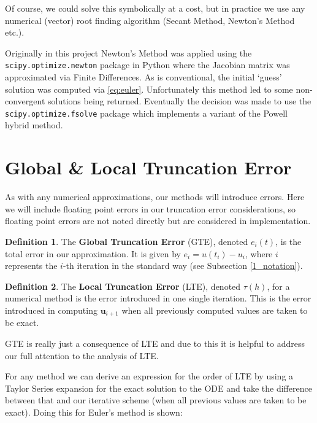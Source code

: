 \documentclass[12pt, twoside]{report}
\theoremstyle{plain}
\theoremstyle{definition}
\newtheorem{definition}{Definition}[chapter]
\theoremstyle{definition}
\begin{document}
            Of course, we could solve this symbolically at a cost, but in
            practice we use any numerical (vector) root finding algorithm 
            (Secant Method, Newton's Method etc.). 

            Originally in this project Newton's Method was applied using the 
            \texttt{scipy.optimize.newton} package in Python where 
            the Jacobian matrix was approximated via Finite Differences. As is 
            conventional, the initial `guess' solution was computed via 
            \eqref{eq:euler}. Unfortunately this method led to some 
            non-convergent solutions being returned. Eventually the decision 
            was made to use the \texttt{scipy.optimize.fsolve} 
            package which implements a variant of the Powell hybrid method.


    \section{Global \& Local Truncation Error}
    \label{2_error}
        As with any numerical approximations, our methods will introduce 
        errors. Here we will include floating point errors in our
        truncation error considerations, so floating point errors are not
        noted directly but are considered in implementation.

        \begin{definition}
            The \textbf{Global Truncation Error} (GTE), denoted $e_{i}(t)$,
            is the total error in our approximation. It is given by 
            $e_i=u(t_i) - u_i$, where $i$ represents the $i$-th iteration
            in the standard way (see Subsection \ref{1_notation}).
        \end{definition}

        \begin{definition}
            The \textbf{Local Truncation Error} (LTE), denoted $\tau (h)$,
            for a numerical method is the error introduced in one single 
            iteration. This is the error introduced in computing 
            $\mathbf{u}_{i+1}$ when all previously computed values are taken 
            to be exact.
        \end{definition}

        GTE is really just a consequence of LTE and due to this it is helpful
        to address our full attention to the analysis of LTE.
        
        For any method we can derive an expression for the order of LTE by 
        using a Taylor Series expansion for the exact solution to the ODE and
        take the difference between that and our iterative scheme (when all 
        previous values are taken to be exact). Doing this for Euler's method 
        is shown:
        
\end{document}

